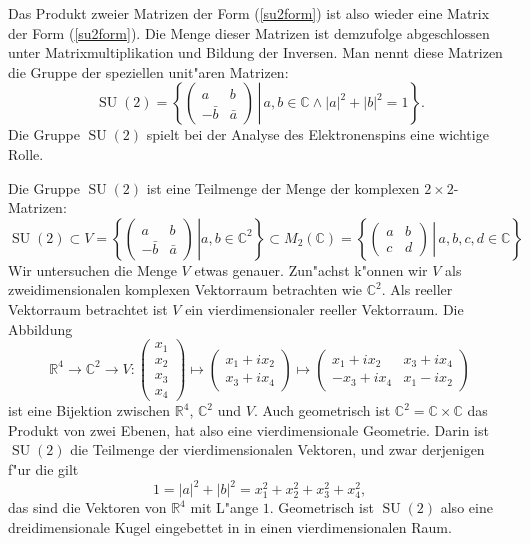 Das Produkt zweier Matrizen der Form (\ref{su2form}) ist also wieder eine
Matrix der Form (\ref{su2form}).
Die Menge dieser Matrizen ist demzufolge abgeschlossen unter
Matrixmultiplikation und Bildung der Inversen.
Man nennt diese Matrizen die Gruppe der speziellen unit"aren Matrizen:
\[
\operatorname{SU}(2)=\left\{
\left.
\begin{pmatrix}
a&b\\-\bar b&\bar a
\end{pmatrix}
\,
\right|
\,
a,b\in\mathbb C\wedge
|a|^2+|b|^2=1
\right\}.
\]
Die Gruppe $\operatorname{SU}(2)$ spielt bei der Analyse des Elektronenspins eine 
wichtige Rolle.

Die Gruppe $\operatorname{SU}(2)$ ist eine Teilmenge der Menge der komplexen
$2\times 2$-Matrizen:
\[
\operatorname{SU}(2)
\subset
V=
\left\{
\left.
\begin{pmatrix}a&b\\-\bar b&\bar a\end{pmatrix}\,
\right|
a,b\in\mathbb C^2
\right\}
\subset
M_2(\mathbb C)
=\left\{
\left.
\begin{pmatrix}
a&b\\c&d
\end{pmatrix}
\,
\right|
\, a,b,c,d\in\mathbb C
\right\}
\]
Wir untersuchen die Menge $V$ etwas genauer.
Zun"achst k"onnen wir $V$ als zweidimensionalen komplexen Vektorraum
betrachten wie $\mathbb C^2$.
Als reeller Vektorraum betrachtet ist $V$ ein vierdimensionaler
reeller Vektorraum. Die Abbildung
\[
\mathbb R^4\to\mathbb C^2\to V
:
\begin{pmatrix}x_1\\x_2\\x_3\\x_4\end{pmatrix}\mapsto
\begin{pmatrix}x_1+ix_2\\x_3+ix_4\end{pmatrix}\mapsto
\begin{pmatrix} x_1+ix_2 & x_3+ix_4 \\
               -x_3+ix_4 & x_1-ix_2 \end{pmatrix}
\]
ist eine Bijektion zwischen $\mathbb R^4$, $\mathbb C^2$ und $V$.
Auch geometrisch ist $\mathbb C^2=\mathbb C\times \mathbb C$ das Produkt
von zwei Ebenen, hat also eine vierdimensionale Geometrie.
Darin ist $\operatorname{SU}(2)$ die Teilmenge der vierdimensionalen Vektoren,
und zwar derjenigen f"ur die gilt
\[
1
=
|a|^2+|b|^2
= 
x_1^2 + x_2^2 + x_3^2 + x_4^2,
\]
das sind die Vektoren von $\mathbb R^4$ mit L"ange $1$.
Geometrisch ist $\operatorname{SU}(2)$ also eine dreidimensionale Kugel
eingebettet in in einen vierdimensionalen Raum.

